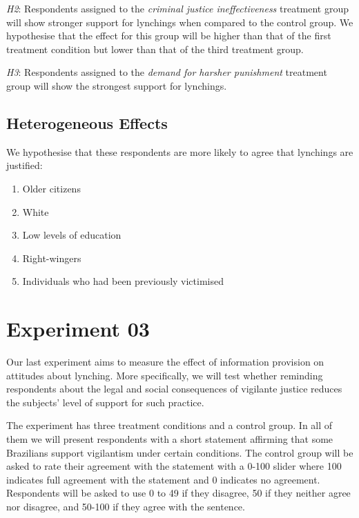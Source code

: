 \documentclass[12pt,a4paper,]{article}
\providecommand{\tightlist}{%
   \setlength{\itemsep}{0pt}\setlength{\parskip}{0pt}}
\begin{document}
\noindent \emph{H2}: Respondents assigned to the \emph{criminal justice
ineffectiveness} treatment group will show stronger support for
lynchings when compared to the control group. We hypothesise that the
effect for this group will be higher than that of the first treatment
condition but lower than that of the third treatment group.

\vspace{.3cm}

\noindent \emph{H3}: Respondents assigned to the \emph{demand for
harsher punishment} treatment group will show the strongest support for
lynchings.

\hypertarget{heterogeneous-effects-1}{%
\subsection{Heterogeneous Effects}\label{heterogeneous-effects-1}}

We hypothesise that these respondents are more likely to agree that
lynchings are justified:

\begin{enumerate}
\def\labelenumi{\arabic{enumi})}
\tightlist
\item
  Older citizens
\item
  White
\item
  Low levels of education
\item
  Right-wingers
\item
  Individuals who had been previously victimised
\end{enumerate}

\hypertarget{experiment-03}{%
\section{Experiment 03}\label{experiment-03}}

Our last experiment aims to measure the effect of information provision
on attitudes about lynching. More specifically, we will test whether
reminding respondents about the legal and social consequences of
vigilante justice reduces the subjects' level of support for such
practice.

The experiment has three treatment conditions and a control group. In
all of them we will present respondents with a short statement affirming
that some Brazilians support vigilantism under certain conditions. The
control group will be asked to rate their agreement with the statement
with a 0-100 slider where 100 indicates full agreement with the
statement and 0 indicates no agreement. Respondents will be asked to use
0 to 49 if they disagree, 50 if they neither agree nor disagree, and
50-100 if they agree with the sentence.
\end{document}
